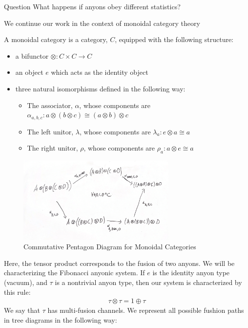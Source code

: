 \documentclass[compress,aspectratio=169,10pt,usenames,dvipsnames]{beamer}
\begin{document}
\begin{frame}
\vfill
\begin{block}{Question}
What happens if anyons obey different statistics?
\end{block}
\vfill
We continue our work in the context of monoidal category theory
\vfill
\begin{definition}
	A monoidal category is a category, $C$, equipped with the following structure:
\begin{itemize}
	\item a bifunctor $\otimes:C\times C\rightarrow C$
	\item an object $e$ which acts as the identity object
	\item three natural isomorphisms defined in the following way:
		\begin{itemize}
			\item The associator, $\alpha$, whose components are $\alpha_{a,b,c}: a\otimes(b\otimes c) \cong (a\otimes b)\otimes c$
			\item The left unitor, $\lambda$, whose components are $\lambda_a : e\otimes a \cong a$
			\item The right unitor, $\rho$, whose components are $\rho_a:a\otimes e \cong a$
		\end{itemize}
\end{itemize}
\end{definition}
\vfill
\end{frame}
%
%
\begin{frame}
\vfill
\begin{figure}[H]
	\centering
	\includegraphics[width=0.7\textwidth]{pent diag.png}
	\caption{Commutative Pentagon Diagram for Monoidal Categories}
\end{figure}
\vfill
\end{frame}


\begin{frame}
\vfill
Here, the tensor product corresponds to the fusion of two anyons. We will be characterizing the Fibonacci anyonic system.
\vfill
If $e$ is the identity anyon type (vacuum), and $\tau$ is a nontrivial anyon type, then our system is characterized by this rule:
\begin{equation}
	\begin{aligned}
		\tau \otimes \tau = 1\oplus \tau
	\end{aligned}
\end{equation}
\vfill
We say that $\tau$ has multi-fusion channels. We represent all possible fushion paths in tree diagrams in the following way:
\vfill
\end{frame}
%
\end{document}
